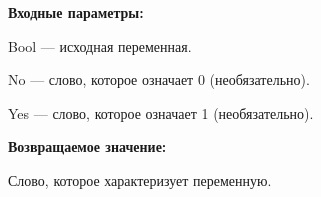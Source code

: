 \textbf{Входные параметры:}

Bool --- исходная переменная.
 
No --- слово, которое означает 0 (необязательно).
 
Yes --- слово, которое означает 1 (необязательно).

\textbf{Возвращаемое значение:}

Слово, которое характеризует переменную.